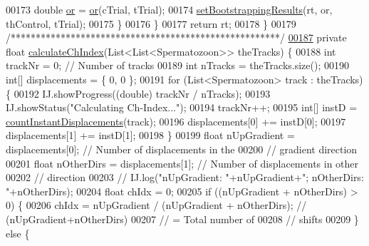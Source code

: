 \begin{DoxyCode}
{00173         \textcolor{keywordtype}{double} \hyperlink{classanalysis_1_1_chemotaxis_a4cf45f4c73ebe44a71a622c690f0b331}{or} = \hyperlink{classanalysis_1_1_chemotaxis_a4cf45f4c73ebe44a71a622c690f0b331}{or}(cTrial, tTrial);
00174         \hyperlink{classanalysis_1_1_chemotaxis_ac5db76309b6da4b0f351cdbb5876fec4}{setBootstrappingResults}(rt, or, thControl, tTrial);
00175       \}
00176     \}
00177     \textcolor{keywordflow}{return} rt;
00178   \}
00179   \textcolor{comment}{/******************************************************/}
\hypertarget{_chemotaxis_8java_source_l00187}{}\hyperlink{classanalysis_1_1_chemotaxis_a4ab493d2d901c65e8387095a69cbf83d}{00187}   \textcolor{keyword}{private} \textcolor{keywordtype}{float} \hyperlink{classanalysis_1_1_chemotaxis_a4ab493d2d901c65e8387095a69cbf83d}{calculateChIndex}(List<List<Spermatozoon>> theTracks) \{
00188     \textcolor{keywordtype}{int} trackNr = 0; \textcolor{comment}{// Number of tracks}
00189     \textcolor{keywordtype}{int} nTracks = theTracks.size();
00190     \textcolor{keywordtype}{int}[] displacements = \{ 0, 0 \};
00191     \textcolor{keywordflow}{for} (List<Spermatozoon> track : theTracks) \{
00192       IJ.showProgress((\textcolor{keywordtype}{double}) trackNr / nTracks);
00193       IJ.showStatus(\textcolor{stringliteral}{"Calculating Ch-Index..."});
00194       trackNr++;
00195       \textcolor{keywordtype}{int}[] instD = \hyperlink{classanalysis_1_1_chemotaxis_a668ad1c1240012d6fb70c1fac4a219be}{countInstantDisplacements}(track);
00196       displacements[0] += instD[0];
00197       displacements[1] += instD[1];
00198     \}
00199     \textcolor{keywordtype}{float} nUpGradient = displacements[0]; \textcolor{comment}{// Number of displacements in the}
00200                                           \textcolor{comment}{// gradient direction}
00201     \textcolor{keywordtype}{float} nOtherDirs = displacements[1]; \textcolor{comment}{// Number of displacements in other}
00202                                          \textcolor{comment}{// direction}
00203     \textcolor{comment}{// IJ.log("nUpGradient: "+nUpGradient+"; nOtherDirs: "+nOtherDirs);}
00204     \textcolor{keywordtype}{float} chIdx = 0;
00205     \textcolor{keywordflow}{if} ((nUpGradient + nOtherDirs) > 0) \{
00206       chIdx = nUpGradient / (nUpGradient + nOtherDirs); \textcolor{comment}{// (nUpGradient+nOtherDirs)}
00207                                                         \textcolor{comment}{// = Total number of}
00208                                                         \textcolor{comment}{// shifts}
00209     \} \textcolor{keywordflow}{else} \{
}
\end{DoxyCode}
